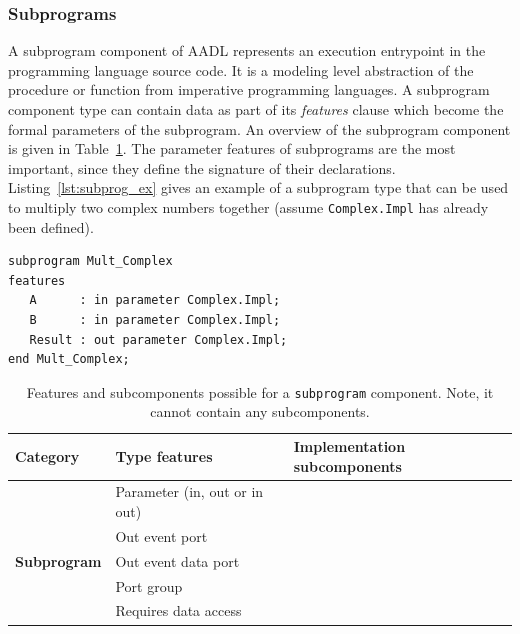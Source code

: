 \subsubsection{Subprograms} A subprogram component of AADL represents an
execution entrypoint in the programming language source code. It is a
modeling level abstraction of the procedure or function from
imperative programming languages. A subprogram component type can
contain data as part of its \emph{features} clause which become the
formal parameters of the subprogram. An overview of the subprogram
component is given in Table~\ref{tab:subprog_rules}. The parameter
features of subprograms are the most important, since they define the
signature of their declarations. Listing~\ref{lst:subprog_ex} gives an
example of a subprogram type that can be used to multiply two complex
numbers together (assume \texttt{Complex.Impl} has already been
defined).

\begin{center}
\begin{minipage}{0.75\linewidth}
\lstset{language=aadl}
\begin{lstlisting}[label=lst:subprog_ex, caption=A subprogram type
    definition to multiply two complex numbers]
subprogram Mult_Complex
features
   A      : in parameter Complex.Impl;
   B      : in parameter Complex.Impl;
   Result : out parameter Complex.Impl;
end Mult_Complex;
\end{lstlisting}
\end{minipage}
\end{center}

\begin{table}
\centering
\begin{tabular}{|l|l|l|}
\hline
\textbf{Category} & \textbf{Type features} & \textbf{Implementation
  subcomponents} \\
\hline
 & Parameter (in, out or in out) & \\
 & Out event port & \\
\textbf{Subprogram} & Out event data port & \\
 & Port group & \\
 & Requires data access & \\
\hline
\end{tabular}
\caption{Features and subcomponents possible for a \texttt{subprogram}
  component. Note, it cannot contain any subcomponents.}
\label{tab:subprog_rules}
\end{table}

